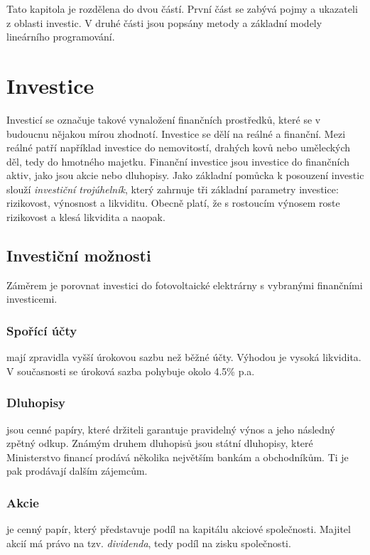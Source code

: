 Tato kapitola je rozdělena do dvou částí. První část se zabývá pojmy a ukazateli z oblasti investic.
V druhé části jsou popsány metody a základní modely lineárního programování.

\section{Investice}


Investicí se označuje takové vynaložení finančních prostředků, které se v budoucnu nějakou mírou zhodnotí.
Investice se dělí na reálné a finanční. Mezi reálné patří například investice do nemovitostí, drahých kovů nebo uměleckých děl, tedy do hmotného majetku.
Finanční investice jsou investice do finančních aktiv, jako jsou akcie nebo dluhopisy.
Jako základní pomůcka k posouzení investic slouží \textit{investiční trojúhelník}, který zahrnuje tři základní parametry investice: rizikovost, výnosnost a likviditu.
Obecně platí, že s rostoucím výnosem roste rizikovost a klesá likvidita a naopak.

\subsection{Investiční možnosti}

Záměrem je porovnat investici do fotovoltaické elektrárny s vybranými finančními investicemi.


\subsubsection{Spořící účty}
mají zpravidla vyšší úrokovou sazbu než běžné účty.
Výhodou je vysoká likvidita.
V současnosti se úroková sazba pohybuje okolo 4.5\% p.a.

\subsubsection{Dluhopisy} jsou cenné papíry,
které držiteli garantuje pravidelný výnos a jeho následný zpětný odkup.
Známým druhem dluhopisů jsou státní dluhopisy, které Ministerstvo financí prodává několika největším bankám a obchodníkům.
Ti je pak prodávají dalším zájemcům.


\subsubsection{Akcie} je cenný papír, který představuje podíl na kapitálu akciové společnosti.
Majitel akcií má právo na tzv. \textit{dividenda}, tedy podíl na zisku společnosti.


